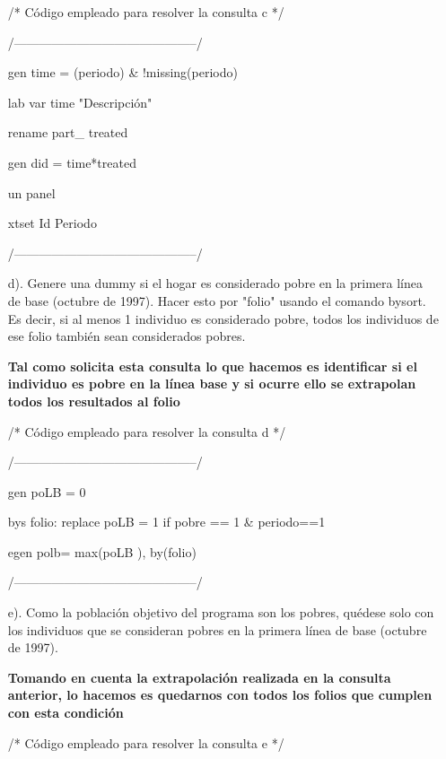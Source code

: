 \documentclass[12pt]{article}
\begin{document}
\begin{enumerate}
\begin{statacode}
/* Código empleado para resolver la consulta c */ 

/--------------------------------------------/

gen time = (periodo) \& !missing(periodo) 

lab var time "Descripción"

rename part\_ treated


gen did = time*treated	

un panel

xtset Id Periodo 

/--------------------------------------------/
\end{statacode}




\item [d).] Genere una dummy si el hogar es considerado pobre en la primera línea de base (octubre de 1997). Hacer esto por "folio" usando el comando bysort. Es decir, si al menos 1 individuo es considerado pobre, todos los individuos de ese folio también sean considerados pobres. 

\textbf{Tal como solicita esta consulta lo que hacemos es identificar si el individuo es pobre en la línea base y si ocurre ello se extrapolan todos los resultados al folio}

\begin{statacode}
/* Código empleado para resolver la consulta d */ 

/--------------------------------------------/

gen poLB = 0

bys folio: replace poLB = 1 if pobre == 1 \& periodo==1

egen polb= max(poLB ), by(folio)

/--------------------------------------------/
\end{statacode}




\item [e).] Como la población objetivo del programa son los pobres, quédese solo con los individuos que se consideran pobres en la primera línea de base (octubre de 1997). 

\textbf{Tomando en cuenta la extrapolación realizada en la consulta anterior, lo hacemos es quedarnos con todos los folios que cumplen con esta condición }

\begin{statacode}
/* Código empleado para resolver la consulta e */ 


\end{statacode}
\end{enumerate}
\end{document}
